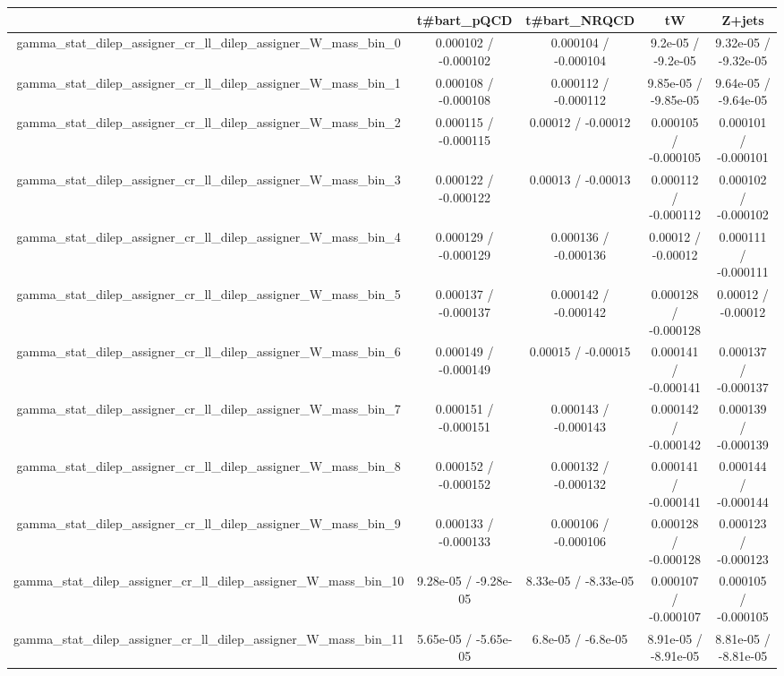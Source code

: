 \documentclass[10pt]{article}
\begin{document}
\begin{table}[htbp]
\begin{center}
\begin{tabular}{|c|c|c|c|c|}
\hline 
      & t#bar{t}_{pQCD}      & t#bar{t}_{NRQCD}      & tW      & Z+jets \\ 
\hline 
  gamma_stat_dilep_assigner_cr_ll_dilep_assigner_W_mass_bin_0 & 0.000102 / -0.000102 & 0.000104 / -0.000104 & 9.2e-05 / -9.2e-05 & 9.32e-05 / -9.32e-05 \\ 
  gamma_stat_dilep_assigner_cr_ll_dilep_assigner_W_mass_bin_1 & 0.000108 / -0.000108 & 0.000112 / -0.000112 & 9.85e-05 / -9.85e-05 & 9.64e-05 / -9.64e-05 \\ 
  gamma_stat_dilep_assigner_cr_ll_dilep_assigner_W_mass_bin_2 & 0.000115 / -0.000115 & 0.00012 / -0.00012 & 0.000105 / -0.000105 & 0.000101 / -0.000101 \\ 
  gamma_stat_dilep_assigner_cr_ll_dilep_assigner_W_mass_bin_3 & 0.000122 / -0.000122 & 0.00013 / -0.00013 & 0.000112 / -0.000112 & 0.000102 / -0.000102 \\ 
  gamma_stat_dilep_assigner_cr_ll_dilep_assigner_W_mass_bin_4 & 0.000129 / -0.000129 & 0.000136 / -0.000136 & 0.00012 / -0.00012 & 0.000111 / -0.000111 \\ 
  gamma_stat_dilep_assigner_cr_ll_dilep_assigner_W_mass_bin_5 & 0.000137 / -0.000137 & 0.000142 / -0.000142 & 0.000128 / -0.000128 & 0.00012 / -0.00012 \\ 
  gamma_stat_dilep_assigner_cr_ll_dilep_assigner_W_mass_bin_6 & 0.000149 / -0.000149 & 0.00015 / -0.00015 & 0.000141 / -0.000141 & 0.000137 / -0.000137 \\ 
  gamma_stat_dilep_assigner_cr_ll_dilep_assigner_W_mass_bin_7 & 0.000151 / -0.000151 & 0.000143 / -0.000143 & 0.000142 / -0.000142 & 0.000139 / -0.000139 \\ 
  gamma_stat_dilep_assigner_cr_ll_dilep_assigner_W_mass_bin_8 & 0.000152 / -0.000152 & 0.000132 / -0.000132 & 0.000141 / -0.000141 & 0.000144 / -0.000144 \\ 
  gamma_stat_dilep_assigner_cr_ll_dilep_assigner_W_mass_bin_9 & 0.000133 / -0.000133 & 0.000106 / -0.000106 & 0.000128 / -0.000128 & 0.000123 / -0.000123 \\ 
  gamma_stat_dilep_assigner_cr_ll_dilep_assigner_W_mass_bin_10 & 9.28e-05 / -9.28e-05 & 8.33e-05 / -8.33e-05 & 0.000107 / -0.000107 & 0.000105 / -0.000105 \\ 
  gamma_stat_dilep_assigner_cr_ll_dilep_assigner_W_mass_bin_11 & 5.65e-05 / -5.65e-05 & 6.8e-05 / -6.8e-05 & 8.91e-05 / -8.91e-05 & 8.81e-05 / -8.81e-05 \\ 

\end{tabular}
\end{center}
\end{table}
\end{document}
